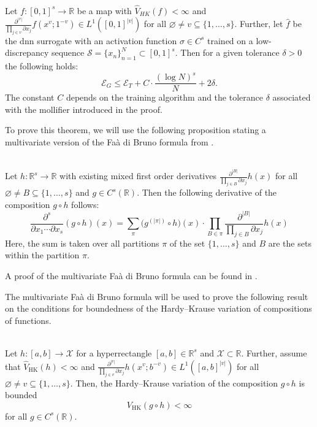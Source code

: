 \begin{theorem} \ \\
Let $f : [0,1]^s \to \mathbb{R}$ be a map with $\widehat{V}_{HK}(f) < \infty$
and $\frac{\partial^{|v|}}{\prod_{j\in v}\partial x_j}f(x^v;1^{-v}) \in
L^1([0,1]^{|v|})$ for all $\varnothing \neq v \subseteq \{1,\dots,s\}$. Further,
let $\hat{f}$ be the \ac{dnn} surrogate with an activation function $\sigma \in
C^s$ trained on a low-discrepancy sequence $\mathcal{S}=\{x_n\}_{n=1}^N\subset
[0,1]^s$. Then for a given tolerance $\delta > 0$ the following holds:
\begin{equation*}
\mathcal{E}_G \leq \mathcal{E}_T + C \cdot \frac{(\log N)^s}{N} + 2\delta.
\end{equation*}
The constant $C$ depends on the training algorithm and the tolerance $\delta$
associated with the mollifier introduced in the proof.
\label{thm:main-theorem}
\end{theorem}

To prove this theorem, we will use the following proposition stating a
multivariate version of the Faà di Bruno formula from
\cite{hardy2006combinatorics}.

\begin{prop} \ \\
Let $h:\mathbb{R}^s \to \mathbb{R}$ with existing mixed first order
derivatives $\frac{\partial^{|B|}}{\prod_{j\in B}\partial x_j} h(x)$
for all $\varnothing \neq B\subseteq \{1,\dots,s\}$ and $g \in
C^s(\mathbb{R})$. Then the following derivative of the
composition $g \circ h$ follows:
\begin{equation*}
    \frac{\partial^s}{\partial x_1 \cdots \partial x_s} (g \circ h)(x) = \sum_{\pi} \big(g^{(|\pi|)}\circ h\big)(x) \cdot \prod_{B\in\pi} \frac{\partial^{|B|}}{\prod_{j\in B}\partial x_j}h(x)
\end{equation*}
Here, the sum is taken over all partitions $\pi$ of the set $\{1,\ldots,s\}$
and $B$ are the sets within the partition $\pi$.
\label{prop:multivariate_faa_di_bruno}
\end{prop}
A proof of the multivariate Faà di Bruno formula can be found in
\cite[Proposition 1]{hardy2006combinatorics}.

The multivariate Faà di Bruno formula will be used to prove the following result on the conditions for boundedness of the Hardy--Krause variation of compositions of functions.

\begin{cor} \ \\
Let $h: [a,b]\to\mathcal{X}$ for a hyperrectangle $[a,b]\in\mathbb{R}^s$ and
$\mathcal{X}\subset \mathbb{R}$. Further, assume that
$\widehat{V}_{\mathrm{HK}}(h) < \infty$ and $\frac{\partial^{|v|}}{\prod_{j\in
v}\partial x_j} h(x^v;b^{-v}) \in L^1([a,b]^{|v|})$ for all $\varnothing \neq
v\subseteq \{1,\dots,s\}$. Then, the Hardy--Krause variation of
the composition $g \circ h$ is bounded
\begin{equation*}
    V_{\mathrm{HK}}(g \circ h) < \infty
\end{equation*}
for all $g \in C^s(\mathbb{R})$.
\label{cor:bounded_composition}
\end{cor}

